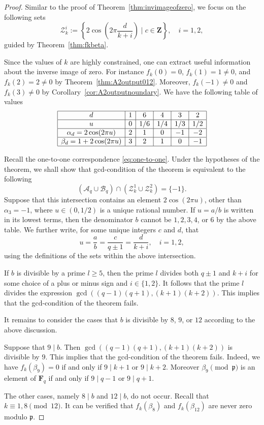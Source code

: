 \documentclass{amsart}
\newcommand{\mf}{\mathfrak}
\newcommand{\mc}{\mathcal}
\newcommand{\Z}{\mathbf Z}
\newcommand{\F}{\mathbf F}
\numberwithin{equation}{section}
\theoremstyle{plain}
\theoremstyle{definition}
\begin{document}
\begin{proof}
Similar to the proof of Theorem~\ref{thm:invimageofzero}, we focus on the following sets
$$\mc{Z}_{k}^i := \left\{ 2\cos\left(2\pi \frac{d}{k+i}\right) \mid c\in \Z \right\}, \quad i=1,2,$$
guided by Theorem~\ref{thm:fkbeta}.

Since the values of $k$ are highly constrained, one can extract useful information about the inverse image of zero. For instance $f_k(0)=0$, $f_k(1)=1 \neq 0$, and $f_k(2)=2\neq 0$ by Theorem~\ref{thm:A2output012}. Moreover, $f_k(-1)\neq 0$ and $f_k(3)\neq 0$ by Corollary~\ref{cor:A2outputnoundary}. We have the following table of values
\[\begin{array}{|c|c|c|c|c|c|c|c|c|c|c|c|c|}\hline
	d & 1 & 6 & 4 & 3 & 2 \\ \hline
	u & 0 & 1/6 & 1/4 & 1/3 & 1/2 \\ \hline
	\alpha_d = 2\cos(2\pi u) & 2 & 1 & 0 & -1 & -2 \\ \hline
	\beta_d = 1+2\cos(2\pi u) & 3 & 2 & 1 & 0 & -1 \\ \hline
\end{array}\]

Recall the one-to-one correspondence \eqref{eq:one-to-one}. 
Under the hypotheses of the theorem, we shall show that gcd-condition of the theorem is equivalent to the following
$$(\mc{A}_{q} \cup \mc{B}_{q}) \cap (\mc{Z}_{k}^1 \cup \mc{Z}_{k}^2) = \{-1\}.$$
Suppose that this intersection contains an element $2\cos(2\pi u)$, other than $\alpha_3=-1$, where $u\in(0,1/2)$ is a unique rational number. If $u=a/b$ is written in its lowest terms, then the denominator $b$ cannot be $1,2,3,4$, or $6$ by the above table. We further write, for some unique integers $c$ and $d$, that
\[u =\frac{a}{b}=\frac{c}{q\pm1} = \frac{d}{k+i}, \quad i=1,2,\]
using the definitions of the sets within the above intersection. 

If $b$ is divisible by a prime $l \ge 5$, then the prime $l$ divides both $q\pm1$ and $k+i$ for some choice of a plus or minus sign and $i \in\{1,2\}$. It follows that the prime $l$ divides the expression $\gcd((q-1)(q+1),(k+1)(k+2))$. This implies that the gcd-condition of the theorem fails.  

It remains to consider the cases that $b$ is divisible by $8$, $9$, or  $12$ according to the above discussion. 

Suppose that $9 \mid b$. Then $\gcd((q-1)(q+1),(k+1)(k+2))$ is divisible by $9$. This implies that the gcd-condition of the theorem fails. Indeed, we have $f_k(\beta_9) =0$ if and only if $9 \mid k+1$ or $9 \mid k+2$. Moreover $\beta_9 \pmod{\mf{p}}$ is an element of $\F_q$ if and  only if $9 \mid q-1$ or $9 \mid q+1$. 

The other cases, namely $8\mid b$ and $12\mid b$, do not occur. Recall that $k\equiv1,8\pmod{12}$. It can be verified that $f_k(\beta_8)$ and $f_k(\beta_{12})$ are never zero modulo $\mf{p}$. 
\end{proof}
\end{document}
